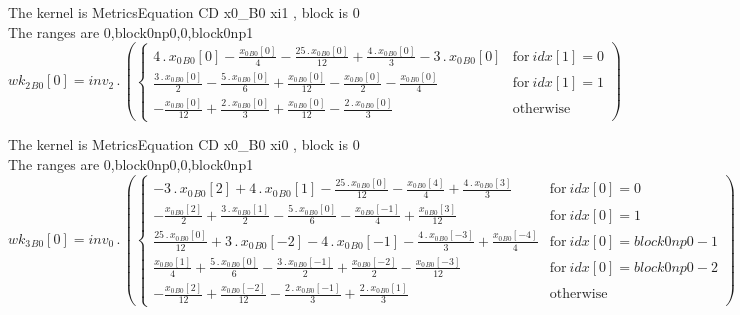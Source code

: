 \documentclass{article}
\begin{document}
\noindent The kernel is MetricsEquation CD x0_B0 xi1 , block is 0\\\noindent The ranges are 0,block0np0,0,block0np1\\\begin{dmath}{wk_{2}{_{B0}}}[{0}] = inv_2 \,.\, \left(\begin{cases} 4 \,.\, {x_{0}{_{B0}}}[{0}] - \frac{{x_{0}{_{B0}}}[{0}]}{4} - \frac{25 \,.\, {x_{0}{_{B0}}}[{0}]}{12} + \frac{4 \,.\, {x_{0}{_{B0}}}[{0}]}{3} - 3 \,.\, {x_{0}{_{B0}}}[{0}] & 
\text{for}\: {idx}[{1}] = 0 \\\frac{3 \,.\, {x_{0}{_{B0}}}[{0}]}{2} - \frac{5 \,.\, {x_{0}{_{B0}}}[{0}]}{6} + \frac{{x_{0}{_{B0}}}[{0}]}{12} - \frac{{x_{0}{_{B0}}}[{0}]}{2} - \frac{{x_{0}{_{B0}}}[{0}]}{4} & \text{for}\: {idx}[{1}] = 1 \\- 
\frac{{x_{0}{_{B0}}}[{0}]}{12} + \frac{2 \,.\, {x_{0}{_{B0}}}[{0}]}{3} + \frac{{x_{0}{_{B0}}}[{0}]}{12} - \frac{2 \,.\, {x_{0}{_{B0}}}[{0}]}{3} & \text{otherwise} \end{cases}\right)\end{dmath}

\noindent The kernel is MetricsEquation CD x0_B0 xi0 , block is 0\\\noindent The ranges are 0,block0np0,0,block0np1\\\begin{dmath}{wk_{3}{_{B0}}}[{0}] = inv_0 \,.\, \left(\begin{cases} - 3 \,.\, {x_{0}{_{B0}}}[{2}] + 4 \,.\, {x_{0}{_{B0}}}[{1}] - \frac{25 \,.\, {x_{0}{_{B0}}}[{0}]}{12} - \frac{{x_{0}{_{B0}}}[{4}]}{4} + \frac{4 \,.\, {x_{0}{_{B0}}}[{3}]}{3} & 
\text{for}\: {idx}[{0}] = 0 \\- \frac{{x_{0}{_{B0}}}[{2}]}{2} + \frac{3 \,.\, {x_{0}{_{B0}}}[{1}]}{2} - \frac{5 \,.\, {x_{0}{_{B0}}}[{0}]}{6} - \frac{{x_{0}{_{B0}}}[{-1}]}{4} + \frac{{x_{0}{_{B0}}}[{3}]}{12} & \text{for}\: {idx}[{0}] = 1 \\\frac{25 
\,.\, {x_{0}{_{B0}}}[{0}]}{12} + 3 \,.\, {x_{0}{_{B0}}}[{-2}] - 4 \,.\, {x_{0}{_{B0}}}[{-1}] - \frac{4 \,.\, {x_{0}{_{B0}}}[{-3}]}{3} + \frac{{x_{0}{_{B0}}}[{-4}]}{4} & \text{for}\: {idx}[{0}] = block0np0 - 1 \\\frac{{x_{0}{_{B0}}}[{1}]}{4} + \frac{5 
\,.\, {x_{0}{_{B0}}}[{0}]}{6} - \frac{3 \,.\, {x_{0}{_{B0}}}[{-1}]}{2} + \frac{{x_{0}{_{B0}}}[{-2}]}{2} - \frac{{x_{0}{_{B0}}}[{-3}]}{12} & \text{for}\: {idx}[{0}] = block0np0 - 2 \\- \frac{{x_{0}{_{B0}}}[{2}]}{12} + \frac{{x_{0}{_{B0}}}[{-2}]}{12} - 
\frac{2 \,.\, {x_{0}{_{B0}}}[{-1}]}{3} + \frac{2 \,.\, {x_{0}{_{B0}}}[{1}]}{3} & \text{otherwise} \end{cases}\right)\end{dmath}
\end{document}
